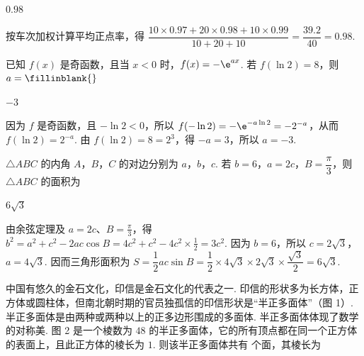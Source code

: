 \begin{answer}
\(0.98\)
\end{answer}

\begin{solution}
按车次加权计算平均正点率，得 \(\dfrac{10\times0.97+20\times0.98+10\times0.99}{10+20+10}=\dfrac{39.2}{40}=0.98\).
\end{solution}

\begin{problem}
已知 \(f(x)\) 是奇函数，且当 \(x<0\) 时，\(f(x)=-\e^{ax}\). 若 \(f(\ln2)=8\)，则 \(a=\fillinblank{}\)
\end{problem}

\begin{answer}
\(-3\)
\end{answer}

\begin{solution}
因为 \(f\) 是奇函数，且 \(-\ln2<0\)，所以 \(f(-\ln2)=-\e^{-a\ln2}=-2^{-a}\)，从而 \(f(\ln2)=2^{-a}\). 由 \(f(\ln2)=8=2^3\)，得 \(-a=3\)，所以 \(a=-3\).
\end{solution}

\begin{problem}
\(\triangle ABC\) 的内角 \(A\)，\(B\)，\(C\) 的对边分别为 \(a\)，\(b\)，\(c\). 若 \(b=6\)，\(a=2c\)，\(B=\dfrac{\pi}{3}\)，则 \(\triangle ABC\) 的面积为\fillinblank{}
\end{problem}

\begin{answer}
\(6\sqrt{3}\)
\end{answer}

\begin{solution}
由余弦定理及 \(a=2c\)、\(B=\frac{\pi}{3}\)，得 \(b^2=a^2+c^2-2ac\cos B=4c^2+c^2-4c^2\times\frac{1}{2}=3c^2\). 因为 \(b=6\)，所以 \(c=2\sqrt3\)，\(a=4\sqrt3\). 因而三角形面积为 \(S=\dfrac12ac\sin B=\dfrac12\times4\sqrt3\times2\sqrt3\times\dfrac{\sqrt3}{2}=6\sqrt3\).
\end{solution}

\begin{problem}
中国有悠久的金石文化，印信是金石文化的代表之一. 印信的形状多为长方体，正方体或圆柱体，但南北朝时期的官员独孤信的印信形状是“半正多面体”（图 1）. 半正多面体是由两种或两种以上的正多边形围成的多面体. 半正多面体体现了数学的对称美. 图 2 是一个棱数为 \(48\) 的半正多面体，它的所有顶点都在同一个正方体的表面上，且此正方体的棱长为 \(1\). 则该半正多面体共有\fillinblank{} 个面，其棱长为\fillinblank{}

\end{problem}

